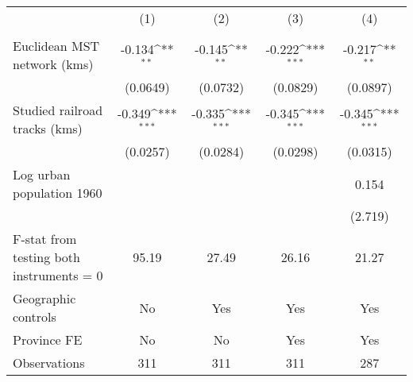{
\def\sym#1{\ifmmode^{#1}\else\(^{#1}\)\fi}
\begin{tabular}{l*{4}{c}}
\hline\hline
                &\multicolumn{1}{c}{(1)}&\multicolumn{1}{c}{(2)}&\multicolumn{1}{c}{(3)}&\multicolumn{1}{c}{(4)}\\
                &\multicolumn{1}{c}{}&\multicolumn{1}{c}{}&\multicolumn{1}{c}{}&\multicolumn{1}{c}{}\\
\hline
Euclidean MST network (kms)&   -0.134\sym{**} &   -0.145\sym{**} &   -0.222\sym{***}&   -0.217\sym{**} \\
                & (0.0649)         & (0.0732)         & (0.0829)         & (0.0897)         \\
[1em]
Studied railroad tracks (kms)&   -0.349\sym{***}&   -0.335\sym{***}&   -0.345\sym{***}&   -0.345\sym{***}\\
                & (0.0257)         & (0.0284)         & (0.0298)         & (0.0315)         \\
[1em]
Log urban population 1960&                  &                  &                  &    0.154         \\
                &                  &                  &                  &  (2.719)         \\
\hline
F-stat from testing both instruments = 0&    95.19         &    27.49         &    26.16         &    21.27         \\
Geographic controls&       No         &      Yes         &      Yes         &      Yes         \\
Province FE     &       No         &       No         &      Yes         &      Yes         \\
Observations    &      311         &      311         &      311         &      287         \\
\hline\hline
\end{tabular}
}
